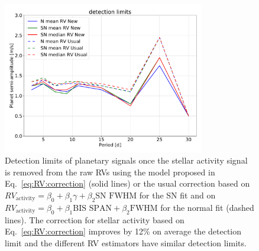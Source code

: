 \documentclass{aa}
\newcommand{\jessi}[1]{{\color{Purple}[[\textbf{Jessi: }#1]]}}
\begin{document}
\begin{figure}[!h]
\begin{center}
\includegraphics[height = 2.6in]{detection_limits.pdf} 
   \caption{Detection limits of planetary signals once the stellar activity signal is removed from the raw RVs using the model proposed in Eq.~\eqref{eq:RV:correction} (solid lines) or the usual correction based on $RV_{\text{activity}}=\beta_0+\beta_1 \gamma + \beta_2 \text{SN FWHM}$ for the SN fit and on $RV_{\text{activity}}=\beta_0+\beta_1 \text{BIS SPAN} + \beta_2 \text{FWHM}$ for the normal fit (dashed lines). The correction for stellar activity based on Eq.~\eqref{eq:RV:correction} improves by 12\% on average the detection limit and the different RV estimators have similar detection limits.}
   \label{fig:detection_limits}
\end{center}
\end{figure}

%

\end{document}
